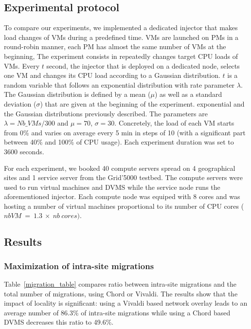 \subsection{Experimental protocol}
To compare our experiments, we implemented a dedicated injector that makes load
changes of VMs during a predefined time.  VMs are launched on PMs in a
round-robin manner, \ie each PM has almost the same number of VMs at the
beginning, The experiment consists in  repeatedly changes target CPU loads of
VMs.  Every $t$ second, the injector that is deployed on a dedicated node,
selects one VM and changes its CPU load according to a Gaussian distribution.
$t$ is a random variable that follows an exponential distribution with rate
parameter $\lambda$. The Gaussian distribution is defined by a mean ($\mu$) as
well as a standard deviation ($\sigma$) that are given at the beginning of the
experiment. 
exponential and the Gaussian distributions previously described. 
The parameters are $\lambda=\mathit{Nb\_VMs}/300$ and $\mu=70$, $\sigma=30$.
Concretely, the load of each VM starts from 0\% and varies on average every 5
min in steps of 10 (with a significant part between 40\% and 100\% of CPU
usage).   Each experiment duration was set to 3600 seconds.

For each experiment, we booked 40 compute servers spread on 4 geographical sites
and 1 service server from the Grid'5000 testbed. The compute servers were used 
to run virtual machines and DVMS while the service node runs the aforementioned
injector.
%
Each compute node was equiped with 8 cores and was hosting a number of virtual
machines proportional to its number of CPU cores
 ($nb VM\ =\ 1.3\ \times\ nb\ cores)$. 

\subsection{Results}


\subsubsection{Maximization of intra-site migrations}

Table~\ref{migration_table} compares ratio between intra-site migrations and the
total number of migrations, using Chord or Vivaldi. The results show that the impact of locality is
significant: using a Vivaldi based network overlay leads to an average number of
86.3\% of intra-site migrations while using a Chord based DVMS decreases this
ratio to 49.6\%.

